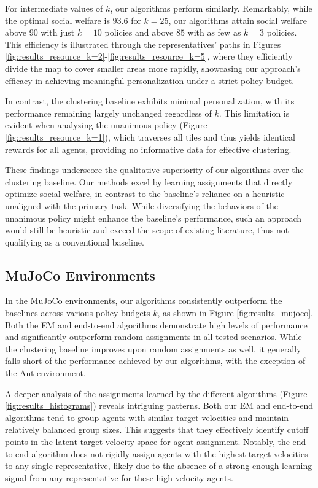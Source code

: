 \documentclass[letterpaper]{article} %
\begin{document}
For intermediate values of $k$, our algorithms perform similarly. Remarkably, while the optimal social welfare is $93.6$ for $k=25$, our algorithms attain social welfare above $90$ with just $k=10$ policies and above $85$ with as few as $k=3$ policies. This efficiency is illustrated through the representatives' paths in Figures \ref{fig:results_resource_k=2}-\ref{fig:results_resource_k=5}, where they efficiently divide the map to cover smaller areas more rapidly, showcasing our approach's efficacy in achieving meaningful personalization under a strict policy budget. %

In contrast, the clustering baseline exhibits minimal personalization, with its performance remaining largely unchanged regardless of $k$. This limitation is evident when analyzing the unanimous policy (Figure \ref{fig:results_resource_k=1}), which traverses all tiles and thus yields identical rewards for all agents, providing no informative data for effective clustering.

These findings underscore the qualitative superiority of our algorithms over the clustering baseline. Our methods excel by learning assignments that directly optimize social welfare, in contrast to the baseline's reliance on a heuristic unaligned with the primary task. While diversifying the behaviors of the unanimous policy might enhance the baseline's performance, such an approach would still be heuristic and exceed the scope of existing literature, thus not qualifying as a conventional baseline.




\subsection{MuJoCo Environments}
\label{sec:experiments_mujoco}

In the MuJoCo environments, our algorithms consistently outperform the baselines across various policy budgets $k$, as shown in Figure \ref{fig:results_mujoco}. Both the EM and end-to-end algorithms demonstrate high levels of performance and significantly outperform random assignments in all tested scenarios. While the clustering baseline improves upon random assignments as well, it generally falls short of the performance achieved by our algorithms, with the exception of the Ant environment.

A deeper analysis of the assignments learned by the different algorithms (Figure \ref{fig:results_histograms}) reveals intriguing patterns. Both our EM and end-to-end algorithms tend to group agents with similar target velocities and maintain relatively balanced group sizes. This suggests that they effectively identify cutoff points in the latent target velocity space for agent assignment. Notably, the end-to-end algorithm does not rigidly assign agents with the highest target velocities to any single representative, likely due to the absence of a strong enough learning signal from any representative for these high-velocity agents.
\end{document}
